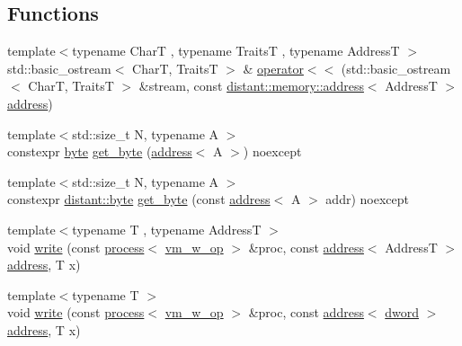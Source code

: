 \subsection*{Functions}
\begin{DoxyCompactItemize}
\item 
{\footnotesize template$<$typename CharT , typename TraitsT , typename AddressT $>$ }\\std\+::basic\+\_\+ostream$<$ CharT, TraitsT $>$ \& \mbox{\hyperlink{namespacedistant_1_1memory_a86dd0cf939f40576160089daa28b3e3f}{operator$<$$<$}} (std\+::basic\+\_\+ostream$<$ CharT, TraitsT $>$ \&stream, const \mbox{\hyperlink{classdistant_1_1memory_1_1address}{distant\+::memory\+::address}}$<$ AddressT $>$ \mbox{\hyperlink{classdistant_1_1memory_1_1address}{address}})
\item 
{\footnotesize template$<$std\+::size\+\_\+t N, typename A $>$ }\\constexpr \mbox{\hyperlink{namespacedistant_af9c3f04a9b855a1368d6c1a9ce28c2f4}{byte}} \mbox{\hyperlink{namespacedistant_1_1memory_a3497f1e6d6d81c0d01cdf57136980099}{get\+\_\+byte}} (\mbox{\hyperlink{classdistant_1_1memory_1_1address}{address}}$<$ A $>$) noexcept
\item 
{\footnotesize template$<$std\+::size\+\_\+t N, typename A $>$ }\\constexpr \mbox{\hyperlink{namespacedistant_af9c3f04a9b855a1368d6c1a9ce28c2f4}{distant\+::byte}} \mbox{\hyperlink{namespacedistant_1_1memory_a3febd1915bbec9ab10979f06dae9ffd9}{get\+\_\+byte}} (const \mbox{\hyperlink{classdistant_1_1memory_1_1address}{address}}$<$ A $>$ addr) noexcept
\item 
{\footnotesize template$<$typename T , typename AddressT $>$ }\\void \mbox{\hyperlink{namespacedistant_1_1memory_adaa15cd72b1436e24239d70964bf3323}{write}} (const \mbox{\hyperlink{classdistant_1_1kernel__objects_1_1process}{process}}$<$ \mbox{\hyperlink{namespacedistant_a6312277824ed2f04c414a61f24c135bb}{vm\+\_\+w\+\_\+op}} $>$ \&proc, const \mbox{\hyperlink{classdistant_1_1memory_1_1address}{address}}$<$ AddressT $>$ \mbox{\hyperlink{classdistant_1_1memory_1_1address}{address}}, T x)
\item 
{\footnotesize template$<$typename T $>$ }\\void \mbox{\hyperlink{namespacedistant_1_1memory_a4a6bb40c53cd73bc18f548238ba977b1}{write}} (const \mbox{\hyperlink{classdistant_1_1kernel__objects_1_1process}{process}}$<$ \mbox{\hyperlink{namespacedistant_a6312277824ed2f04c414a61f24c135bb}{vm\+\_\+w\+\_\+op}} $>$ \&proc, const \mbox{\hyperlink{classdistant_1_1memory_1_1address}{address}}$<$ \mbox{\hyperlink{namespacedistant_a9fa41a5a1a17dcbd24da1c1855c92489}{dword}} $>$ \mbox{\hyperlink{classdistant_1_1memory_1_1address}{address}}, T x)

\end{DoxyCompactItemize}
